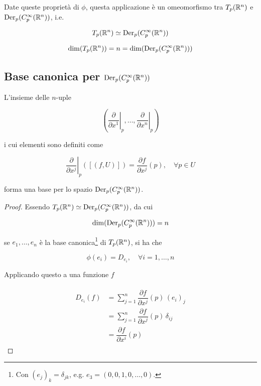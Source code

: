 Date queste proprietà di $ \phi $, questa applicazione è un omeomorfismo tra $ T_{p}(\mathbb{R}^{n}) $ e $ \operatorname{Der}_{p}(C_{p}^{\infty}(\mathbb{R}^{n})) $, i.e.

\begin{equation}
	T_{p}(\mathbb{R}^{n}) \simeq \operatorname{Der}_{p}(C_{p}^{\infty}(\mathbb{R}^{n}))
\end{equation}

\begin{corollary}
	\begin{equation}
		\dim ( T_{p}(\mathbb{R}^{n}) ) = n = \dim ( \operatorname{Der}_{p}(C_{p}^{\infty}(\mathbb{R}^{n})) )
	\end{equation}
\end{corollary}

\subsection{Base canonica per $ \operatorname{Der}_{p}(C_{p}^{\infty}(\mathbb{R}^{n})) $}

L'insieme delle $ n $-uple

\begin{equation}
	\left( \left. \dfrac{\partial}{\partial x^{1}} \right|_{p},\dots,\left. \dfrac{\partial}{\partial x^{n}} \right|_{p} \right)
\end{equation}

i cui elementi sono definiti come

\begin{equation}
	\left. \dfrac{\partial}{\partial x^{j}} \right|_{p} ([(f,U)]) = \dfrac{\partial f}{\partial x^{j}} (p), \quad \forall p \in U
\end{equation}

forma una base per lo spazio $ \operatorname{Der}_{p}(C_{p}^{\infty}(\mathbb{R}^{n})) $.

\begin{proof}
	Essendo $ T_{p}(\mathbb{R}^{n}) \simeq \operatorname{Der}_{p}(C_{p}^{\infty}(\mathbb{R}^{n})) $, da cui
	
	\begin{equation}
		\dim ( \operatorname{Der}_{p}(C_{p}^{\infty}(\mathbb{R}^{n})) ) = n
	\end{equation}
		
	se $ e_{1},\dots,e_{n} $ è la base canonica\footnote{%
		Con $ (e_{j})_{k} = \delta_{jk} $, e.g. $ e_{3} = (0,0,1,0,\dots,0) $.%
	} di $ T_{p}(\mathbb{R}^{n}) $, si ha che

	\begin{equation}
		\phi(e_{i}) = D_{e_{i}}, \quad \forall i=1,\dots,n
	\end{equation}

	Applicando questo a una funzione $ f $
	
	\begin{align}
		\begin{split}
			D_{e_{i}} (f) &= \sum_{j=1}^{n} \dfrac{\partial f}{\partial x^{j}} (p) \, (e_{i})_{j}\\
			&= \sum_{j=1}^{n} \dfrac{\partial f}{\partial x^{j}} (p) \, \delta_{ij}\\
			&= \dfrac{\partial f}{\partial x^{i}} (p)
		\end{split}
	\end{align}
\end{proof}

